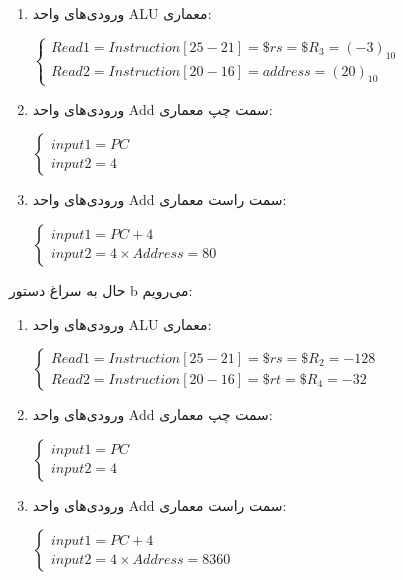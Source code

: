 \begin{enumerate}
	\item ورودی‌های واحد ALU معماری:
	
	\setLTR
	$
	\begin{cases}
		Read1= Instruction[25-21] =\$rs = \$R_3 = (-3)_{10} \\
		Read2 =Instruction[20-16]= address = (20)_{10}
		
	\end{cases}
	$
	\setRTL
	
	\item ورودی‌های واحد Add سمت چپ معماری:
	
	\setLTR
	$
	\begin{cases}
		input1= PC  \\
		input2 = 4
		
	\end{cases}
	$
	
	\setRTL
	
	\item ورودی‌های واحد Add سمت راست معماری:
	
	\setLTR
	
	$
	\begin{cases}
		input1= PC + 4 \\
		input2 = 4 \times Address = 80
		
	\end{cases}
	$
	\setRTL
	
	
\end{enumerate}

\pagebreak

حال به سراغ دستور b می‌رویم:


\begin{enumerate}
	\item ورودی‌های واحد ALU معماری:
	
	\setLTR
	$
	\begin{cases}
		Read1= Instruction[25-21] =\$rs = \$R_2 = -128 \\
		Read2 =Instruction[20-16]= \$rt =\$R_4 = -32
		
	\end{cases}
	$
	\setRTL
	
	\item ورودی‌های واحد Add سمت چپ معماری:
	
	\setLTR
	$
	\begin{cases}
		input1= PC  \\
		input2 = 4
		
	\end{cases}
	$
	
	\setRTL
	
	\item ورودی‌های واحد Add سمت راست معماری:
	
	\setLTR
	$
	\begin{cases}
		input1= PC + 4  \\
		input2 = 4 \times Address = 8360
		
	\end{cases}
	$
	
	\setRTL
	
\end{enumerate}
\pagebreak
